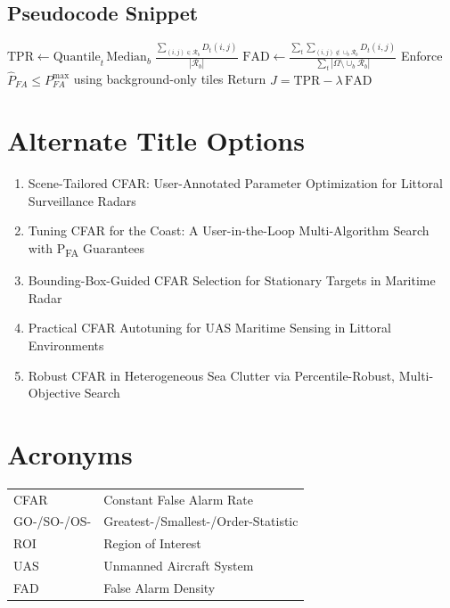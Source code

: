 \documentclass[10pt,letterpaper]{article}
\begin{document}
\subsection{Pseudocode Snippet}
\begin{algorithm}[h]
\caption{Score and Constraint Evaluation}
\begin{algorithmic}[1]
\STATE $\mathrm{TPR}\leftarrow \mathrm{Quantile}_t\,\mathrm{Median}_b\;\frac{\sum_{(i,j)\in\mathcal{R}_b} D_t(i,j)}{|\mathcal{R}_b|}$
\STATE $\mathrm{FAD}\leftarrow \frac{\sum_{t}\sum_{(i,j)\notin\cup_b \mathcal{R}_b} D_t(i,j)}{\sum_{t}|\Omega\setminus\cup_b \mathcal{R}_b|}$
\STATE Enforce $\widehat{P}_{FA}\le P_{FA}^{\max}$ using background-only tiles
\STATE Return $J=\mathrm{TPR}-\lambda\,\mathrm{FAD}$
\end{algorithmic}
\end{algorithm}

\section{Alternate Title Options}
\begin{enumerate}
  \item Scene-Tailored CFAR: User-Annotated Parameter Optimization for Littoral Surveillance Radars
  \item Tuning CFAR for the Coast: A User-in-the-Loop Multi-Algorithm Search with P\textsubscript{FA} Guarantees
  \item Bounding-Box-Guided CFAR Selection for Stationary Targets in Maritime Radar
  \item Practical CFAR Autotuning for UAS Maritime Sensing in Littoral Environments
  \item Robust CFAR in Heterogeneous Sea Clutter via Percentile-Robust, Multi-Objective Search
\end{enumerate}

\section{Acronyms}
\begin{tabular}{ll}
CFAR & Constant False Alarm Rate \\
GO-/SO-/OS- & Greatest-/Smallest-/Order-Statistic \\
ROI & Region of Interest \\
UAS & Unmanned Aircraft System \\
FAD & False Alarm Density \\
\end{tabular}
\end{document}
